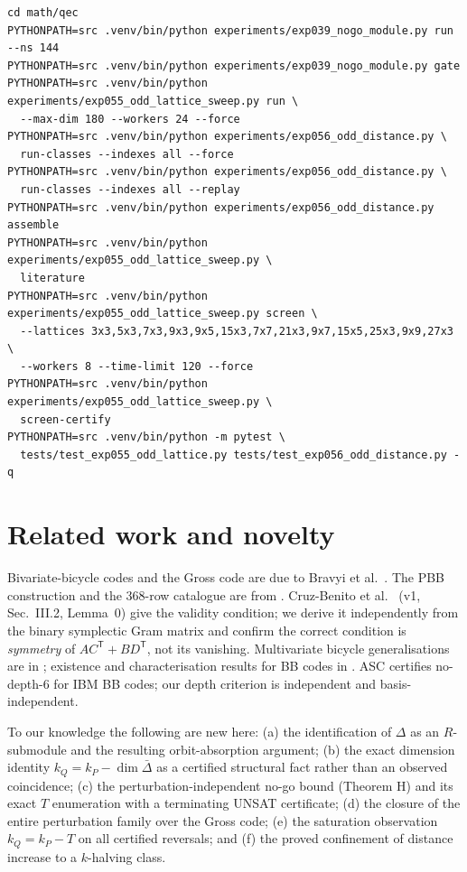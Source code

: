 \documentclass[11pt]{article}
\theoremstyle{plain}
\theoremstyle{remark}
\begin{document}
{\footnotesize
\begin{verbatim}
cd math/qec
PYTHONPATH=src .venv/bin/python experiments/exp039_nogo_module.py run --ns 144
PYTHONPATH=src .venv/bin/python experiments/exp039_nogo_module.py gate
PYTHONPATH=src .venv/bin/python experiments/exp055_odd_lattice_sweep.py run \
  --max-dim 180 --workers 24 --force
PYTHONPATH=src .venv/bin/python experiments/exp056_odd_distance.py \
  run-classes --indexes all --force
PYTHONPATH=src .venv/bin/python experiments/exp056_odd_distance.py \
  run-classes --indexes all --replay
PYTHONPATH=src .venv/bin/python experiments/exp056_odd_distance.py assemble
PYTHONPATH=src .venv/bin/python experiments/exp055_odd_lattice_sweep.py \
  literature
PYTHONPATH=src .venv/bin/python experiments/exp055_odd_lattice_sweep.py screen \
  --lattices 3x3,5x3,7x3,9x3,9x5,15x3,7x7,21x3,9x7,15x5,25x3,9x9,27x3 \
  --workers 8 --time-limit 120 --force
PYTHONPATH=src .venv/bin/python experiments/exp055_odd_lattice_sweep.py \
  screen-certify
PYTHONPATH=src .venv/bin/python -m pytest \
  tests/test_exp055_odd_lattice.py tests/test_exp056_odd_distance.py -q
\end{verbatim}
}

\section{Related work and novelty}\label{sec:related}

Bivariate-bicycle codes and the Gross code are due to Bravyi et
al.~\cite{bravyi2024faulttolerant}. The PBB construction and the $368$-row catalogue are
from \cite{cruzbenito2026evolutionary}. Cruz-Benito et al.~\cite{cruzbenito2026evolutionary}
(v1, Sec.~III.2, Lemma~0) give the
validity condition; we derive it independently from the binary symplectic Gram matrix and
confirm the correct condition is \emph{symmetry} of $AC^{\mathsf T}+BD^{\mathsf T}$, not its
vanishing. Multivariate bicycle generalisations are in \cite{voss2024multivariate};
existence and characterisation results for BB codes in
\cite{postema2025existence}. ASC \cite{zhang2026asc} certifies
no-depth-$6$ for IBM BB codes; our depth criterion is independent and basis-independent.

To our knowledge the following are new here: (a) the identification of $\Delta$ as an
$R$-submodule and the resulting orbit-absorption argument; (b) the exact dimension
identity $k_Q=k_P-\dim\bar\Delta$ as a certified structural fact rather than an observed
coincidence; (c) the perturbation-independent no-go bound (Theorem H) and its exact
$T$ enumeration with a terminating UNSAT certificate; (d) the closure of the entire
perturbation family over the Gross code; (e) the saturation observation $k_Q=k_P-T$ on
all certified reversals; and (f) the proved confinement of distance increase to a
$k$-halving class.
\end{document}
